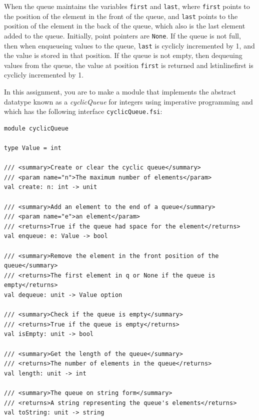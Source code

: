 When the queue maintains the variables \lstinline{first} and \lstinline{last}, where \lstinline{first} points to the position of the element in the front of the queue, and \lstinline{last} points to the position of the element in the back of the queue, which also is the last element added to the queue. Initially, point pointers are \lstinline{None}. If the queue is not full, then when enqueueing values to the queue, \lstinline{last} is cyclicly incremented by 1, and the value is stored in that position. If the queue is not empty, then dequeuing values from the queue, the value at position \lstinline{first} is returned and lstinline{first} is cyclicly incremented by 1.

In this assignment, you are to make a module that implements the abstract datatype known as a \emph{cyclicQueue} for integers using imperative programming and which has the following interface \lstinline[language=console]{cyclicQueue.fsi}:
\begin{lstlisting}
module cyclicQueue

type Value = int

/// <summary>Create or clear the cyclic queue</summary>
/// <param name="n">The maximum number of elements</param>
val create: n: int -> unit

/// <summary>Add an element to the end of a queue</summary>
/// <param name="e">an element</param>
/// <returns>True if the queue had space for the element</returns>
val enqueue: e: Value -> bool

/// <summary>Remove the element in the front position of the queue</summary>
/// <returns>The first element in q or None if the queue is empty</returns>
val dequeue: unit -> Value option

/// <summary>Check if the queue is empty</summary>
/// <returns>True if the queue is empty</returns>
val isEmpty: unit -> bool

/// <summary>Get the length of the queue</summary>
/// <returns>The number of elements in the queue</returns>
val length: unit -> int

/// <summary>The queue on string form</summary>
/// <returns>A string representing the queue's elements</returns>
val toString: unit -> string
\end{lstlisting}
